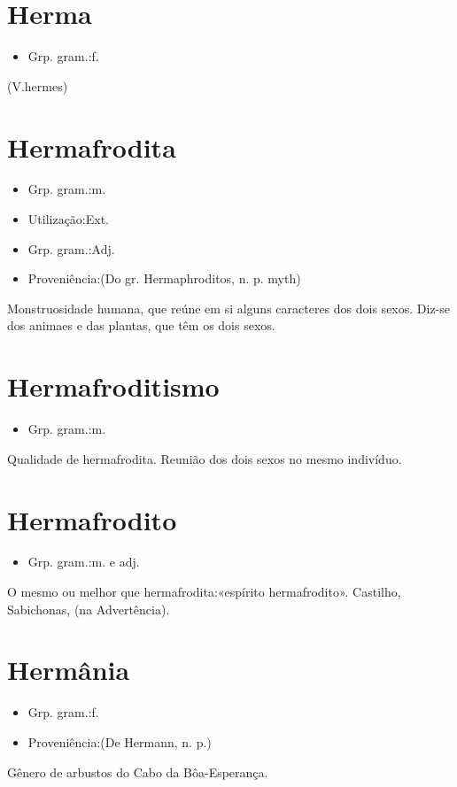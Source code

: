 \documentclass{article}
\begin{document}
\section{Herma}
\begin{itemize}
\item {Grp. gram.:f.}
\end{itemize}
(V.hermes)
\section{Hermafrodita}
\begin{itemize}
\item {Grp. gram.:m.}
\end{itemize}
\begin{itemize}
\item {Utilização:Ext.}
\end{itemize}
\begin{itemize}
\item {Grp. gram.:Adj.}
\end{itemize}
\begin{itemize}
\item {Proveniência:(Do gr. \textunderscore Hermaphroditos\textunderscore , n. p. myth)}
\end{itemize}
Monstruosidade humana, que reúne em si alguns caracteres dos dois sexos.
Diz-se dos animaes e das plantas, que têm os dois sexos.
\section{Hermafroditismo}
\begin{itemize}
\item {Grp. gram.:m.}
\end{itemize}
Qualidade de hermafrodita.
Reunião dos dois sexos no mesmo indivíduo.
\section{Hermafrodito}
\begin{itemize}
\item {Grp. gram.:m.  e  adj.}
\end{itemize}
O mesmo ou melhor que \textunderscore hermafrodita\textunderscore :«\textunderscore espírito hermafrodito\textunderscore ». Castilho, \textunderscore Sabichonas\textunderscore , (na Advertência).
\section{Hermânia}
\begin{itemize}
\item {Grp. gram.:f.}
\end{itemize}
\begin{itemize}
\item {Proveniência:(De \textunderscore Hermann\textunderscore , n. p.)}
\end{itemize}
Gênero de arbustos do Cabo da Bôa-Esperança.
\end{document}
